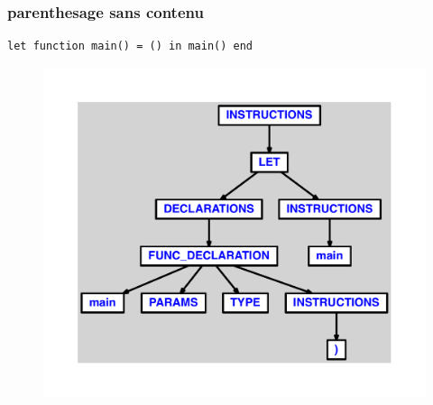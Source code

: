 \documentclass{article}
\begin{document}
\subsubsection{parenthesage sans contenu}
\begin{lstlisting}
let function main() = () in main() end
\end{lstlisting}
\newpage
\begin{figure}[H]
\centering
\includegraphics[max width=\textwidth]{ast/ast_33.pdf}
\end{figure}
\newpage
\end{document}
